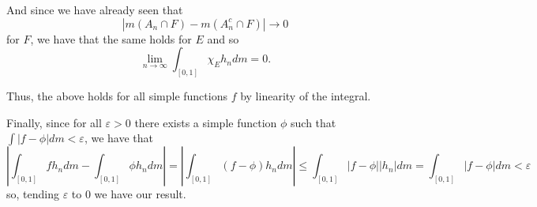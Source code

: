\documentclass[12pt]{Homework}
\begin{document}
\begin{solution}
And since we have already seen that $$|m(A_n\cap F)-m(A_n^c\cap F)|\to0$$ for $F$, we have that the same holds for $E$ and so $$\lim_{n\to\infty}\int_{[0,1]}\chi_Eh_ndm=0.$$

Thus, the above holds for all simple functions $f$ by linearity of the integral. 

Finally, since for all $\varepsilon>0$ there exists a simple function $\phi$ such that $\int|f-\phi|dm<\varepsilon$, we have that $$\left|\int_{[0,1]}fh_ndm-\int_{[0,1]}\phi h_ndm\right|=\left|\int_{[0,1]}(f-\phi)h_ndm\right|\le\int_{[0,1]}|f-\phi||h_n|dm=\int_{[0,1]}|f-\phi|dm<\varepsilon$$ so, tending $\varepsilon$ to $0$ we have our result.
\end{solution}
\vspace{0.5cm}
\end{document}
